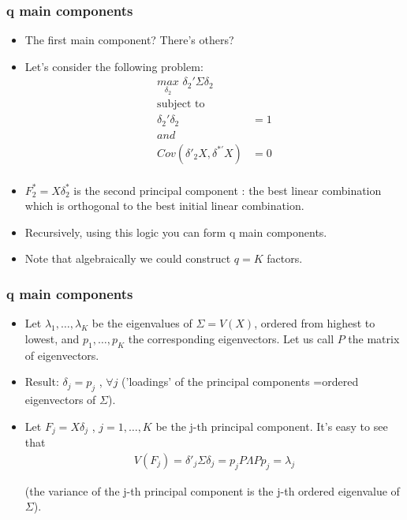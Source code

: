 \documentclass[
  shownotes,
  xcolor={svgnames},
  hyperref={colorlinks,citecolor=DarkBlue,linkcolor=DarkRed,urlcolor=DarkBlue}
  , aspectratio=169]{beamer}
\begin{document}
\begin{frame}
\frametitle{q main components}

\begin{itemize}

\item The first main component? There's others?
\item Let's consider the following problem:
\begin{align}
\underset{\delta_2}{max}\,\, \delta_2' \Sigma \delta_2 \\ \nonumber
\text{subject to}  \\ \nonumber
\delta_2' \delta_2 &= 1 \\ \nonumber
and \\ \nonumber
Cov(\delta'_2 X,\delta^{*'}X) &=0 \\ \nonumber
\end{align}

\item $F_2^*=X\delta^*_2$ is the second principal component : the best linear combination which is
orthogonal to the best initial linear combination.
\item Recursively, using this logic you can form q  main components. 
\item Note that algebraically we could construct $q = K$ factors.
\end{itemize}
\end{frame}

\begin{frame}
\frametitle{q main components}

\begin{itemize}
\item Let $\lambda_1,\dots,\lambda_K$ be the eigenvalues of $\Sigma = V(X)$, ordered from highest to lowest, and $p_1 , \dots , p_K$ the corresponding eigenvectors. Let us call $P$ the matrix of eigenvectors.
\item Result: $\delta_j = p_j$ , $\forall j$ ('loadings' of the principal components =ordered eigenvectors of $\Sigma$).
\item Let $F_j = X \delta_j$ , $j = 1, \dots, K$ be the j-th principal component. It's easy to see that
\begin{align}
V (F_j ) = \delta'_j \Sigma \delta_j = p_j P\Lambda P p_j = \lambda_j
\end{align}

(the variance of the j-th principal component is the j-th ordered eigenvalue of $\Sigma$).
\end{itemize}


\end{frame}
\end{document}
